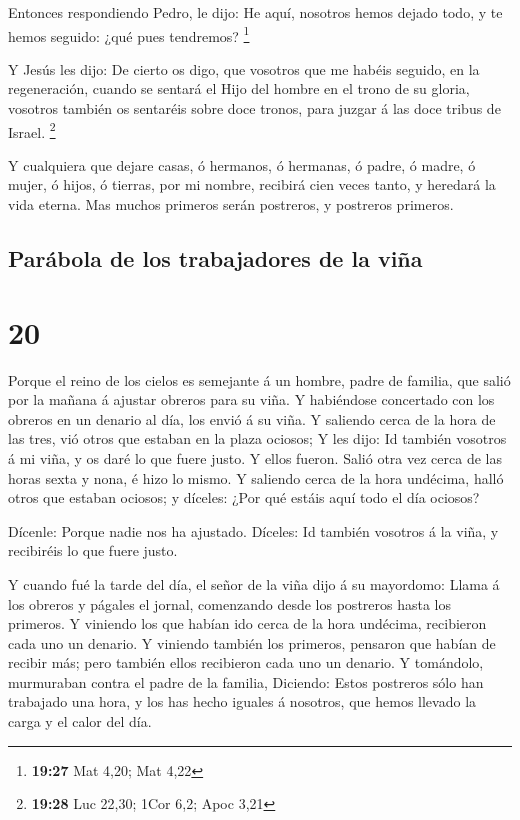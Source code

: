  Entonces respondiendo Pedro, le dijo: He aquí, nosotros
hemos dejado todo, y te hemos seguido: ¿qué pues tendremos? \footnote{\textbf{19:27}
  Mat 4,20; Mat 4,22}

 Y Jesús les dijo: De cierto os digo, que vosotros que me
habéis seguido, en la regeneración, cuando se sentará el Hijo del hombre
en el trono de su gloria, vosotros también os sentaréis sobre doce
tronos, para juzgar á las doce tribus de Israel. \footnote{\textbf{19:28}
  Luc 22,30; 1Cor 6,2; Apoc 3,21}

 Y cualquiera que dejare casas, ó hermanos, ó hermanas, ó
padre, ó madre, ó mujer, ó hijos, ó tierras, por mi nombre, recibirá
cien veces tanto, y heredará la vida eterna.  Mas muchos
primeros serán postreros, y postreros primeros.

\hypertarget{paruxe1bola-de-los-trabajadores-de-la-viuxf1a}{%
\subsection{Parábola de los trabajadores de la
viña}\label{paruxe1bola-de-los-trabajadores-de-la-viuxf1a}}

\hypertarget{section-19}{%
\section{20}\label{section-19}}

 Porque el reino de los cielos es semejante á un hombre,
padre de familia, que salió por la mañana á ajustar obreros para su
viña.  Y habiéndose concertado con los obreros en un denario
al día, los envió á su viña.  Y saliendo cerca de la hora de
las tres, vió otros que estaban en la plaza ociosos;  Y les
dijo: Id también vosotros á mi viña, y os daré lo que fuere justo. Y
ellos fueron.  Salió otra vez cerca de las horas sexta y
nona, é hizo lo mismo.  Y saliendo cerca de la hora
undécima, halló otros que estaban ociosos; y díceles: ¿Por qué estáis
aquí todo el día ociosos?

 Dícenle: Porque nadie nos ha ajustado. Díceles: Id también
vosotros á la viña, y recibiréis lo que fuere justo.

 Y cuando fué la tarde del día, el señor de la viña dijo á
su mayordomo: Llama á los obreros y págales el jornal, comenzando desde
los postreros hasta los primeros.  Y viniendo los que habían
ido cerca de la hora undécima, recibieron cada uno un denario.
 Y viniendo también los primeros, pensaron que habían de
recibir más; pero también ellos recibieron cada uno un denario.
 Y tomándolo, murmuraban contra el padre de la familia,
 Diciendo: Estos postreros sólo han trabajado una hora, y
los has hecho iguales á nosotros, que hemos llevado la carga y el calor
del día.


